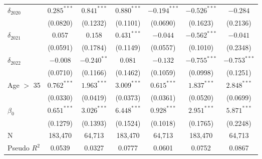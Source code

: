 \begin{tabular}{l|ccc|ccc}
$\delta_{2020}$               &   $0.285^{***}$ &   $0.841^{***}$ &   $0.880^{***}$ &         $-0.194^{***}$ &  $-0.526^{***}$ &        $-0.284$ \\
                              &        (0.0820) &        (0.1232) &        (0.1101) &               (0.0690) &        (0.1623) &        (0.2136) \\
$\delta_{2021}$               &         $0.057$ &         $0.158$ &   $0.431^{***}$ &               $-0.044$ &  $-0.562^{***}$ &        $-0.041$ \\
                              &        (0.0591) &        (0.1784) &        (0.1149) &               (0.0557) &        (0.1010) &        (0.2348) \\
$\delta_{2022}$               &        $-0.008$ &   $-0.240^{**}$ &         $0.081$ &               $-0.132$ &  $-0.755^{***}$ &  $-0.753^{***}$ \\
                              &        (0.0710) &        (0.1166) &        (0.1462) &               (0.1059) &        (0.0998) &        (0.1251) \\
Age $>$ 35                    &   $0.762^{***}$ &   $1.963^{***}$ &   $3.009^{***}$ &          $0.615^{***}$ &   $1.837^{***}$ &   $2.848^{***}$ \\
                              &        (0.0330) &        (0.0419) &        (0.0373) &               (0.0361) &        (0.0520) &        (0.0699) \\
$\beta_0$                     &   $0.651^{***}$ &   $3.026^{***}$ &   $6.448^{***}$ &          $0.928^{***}$ &   $2.951^{***}$ &   $5.871^{***}$ \\
                              &        (0.1279) &        (0.1393) &        (0.1524) &               (0.1018) &        (0.1765) &        (0.2248) \\
N                             &         183,470 &          64,713 &         183,470 &                 64,713 &         183,470 &          64,713 \\
Pseudo $R^2$                  &          0.0539 &          0.0327 &          0.0777 &                 0.0601 &          0.0752 &          0.0867 \\
\bottomrule
\end{tabular}
